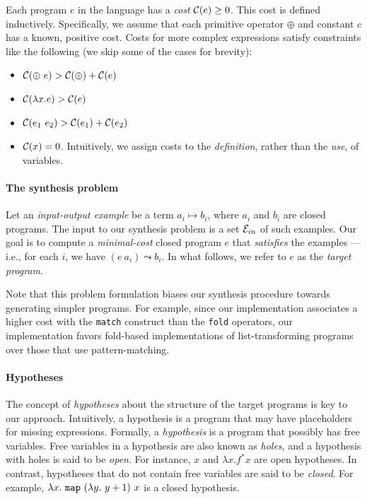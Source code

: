 Each program $e$ in the language has a {\em cost} $\mathcal{C}(e) \ge 0$.  This
cost is defined inductively. Specifically, we assume that each
primitive operator $\oplus$ and constant $c$ has a known, positive
cost. Costs for more complex expressions satisfy constraints like the
following (we skip some of the cases for brevity):
\begin{itemize}
\item $\mathcal{C}(\oplus~e) > \mathcal{C}(\oplus) + \mathcal{C}(e)$
\item $\mathcal{C}(\lambda x. e) > \mathcal{C}(e)$ 
\item $\mathcal{C}(e_1~e_2) > \mathcal{C}(e_1) + \mathcal{C}(e_2)$
\item $\mathcal{C}(x) = 0$. Intuitively, we assign costs to the {\em definition},
  rather than the {\em use}, of variables.
\end{itemize}



\paragraph{The synthesis problem}

Let an {\em input-output example} be a term $a_i \mapsto b_i$, where
$a_i$ and $b_i$ are closed programs. The input to our synthesis
problem is a set $\mathcal{E}_{in}$ of such examples. Our goal is to
compute a {\em minimal-cost} closed program $e$ 
that {\em satisfies} the examples --- i.e., for each $i$, we have $(e~a_i)
\leadsto b_i$. In what follows, we refer to $e$ as the \emph{target program}.

Note that this problem formulation biases our synthesis procedure towards
generating simpler programs. For example, since our implementation associates a higher cost 
with the {\tt match} %
construct than the \verb+fold+ %
operators, our implementation favors fold-based implementations of list-transforming programs
over those that use pattern-matching.


\paragraph{Hypotheses} The concept of {\em hypotheses} about the
structure of the target programs is key to our approach. Intuitively,
a hypothesis is a program that may have placeholders for missing
expressions. Formally, a {\em hypothesis} is a program that possibly
has free variables. Free variables in a hypothesis are also known as
{\em holes}, and a hypothesis with holes is said to be {\em open}. For
instance, $x$ and $\lambda x. f^* x$ are open hypotheses. In contrast, 
hypotheses that do not contain free variables are said to be \emph{closed}. 
For example, $\lambda x. \ {\tt map} \ (\lambda y. \ y+1) \ x$ is a closed hypothesis.

